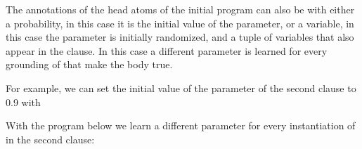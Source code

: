 \documentclass[letterpaper,10pt,english]{sphinxmanual}
\begin{document}
\sphinxAtStartPar
The annotations of the head atoms of the initial program can also be  with  either a probability, in this case it is the initial value of the parameter, or a variable, in this case the parameter is initially randomized, and  a tuple of variables that also appear in the clause.
In this case a different parameter is learned for every grounding of  that make the body true.

\sphinxAtStartPar
For example, we can set the initial value of the parameter of the second clause to 0.9 with

\begin{sphinxVerbatim}[commandchars=\\\{\}]
\PYG{p}{[} 
         
        \PYG{p}{]}
\end{sphinxVerbatim}

\sphinxAtStartPar
With the program below we learn a different parameter for every instantiation of  in the second clause:

\begin{sphinxVerbatim}[commandchars=\\\{\}]
\PYG{p}{[} 
         
        \PYG{p}{]}
\end{sphinxVerbatim}
\end{document}
